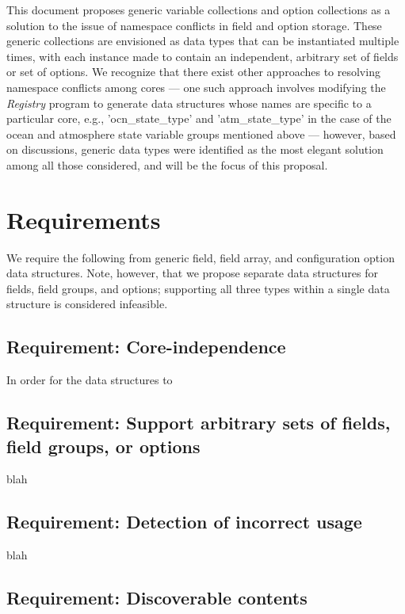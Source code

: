 \documentclass[11pt]{report}
\begin{document}
This document proposes generic variable collections and option collections as a solution to the issue of namespace conflicts in field and option storage. These generic collections are envisioned as data types that can be instantiated multiple times, with each instance made to contain an independent, arbitrary set of fields or set of options. We recognize that there exist other approaches to resolving namespace conflicts among cores --- one such approach involves modifying the {\em Registry} program to generate data structures whose names are specific to a particular core, e.g., 'ocn\_state\_type' and 'atm\_state\_type' in the case of the ocean and atmosphere state variable groups mentioned above --- however, based on discussions, generic data types were identified as the most elegant solution among all those considered, and will be the focus of this proposal.


%
%
\chapter{Requirements}
 
We require the following from generic field, field array, and configuration option data structures. Note, however, that we propose separate data structures for fields, field groups, and options; supporting all three types within a single data structure is considered infeasible.

\section{Requirement: Core-independence}

In order for the data structures to 

\section{Requirement: Support arbitrary sets of fields, field groups, or options}

blah

\section{Requirement: Detection of incorrect usage}

blah

\section{Requirement: Discoverable contents}
\end{document}
